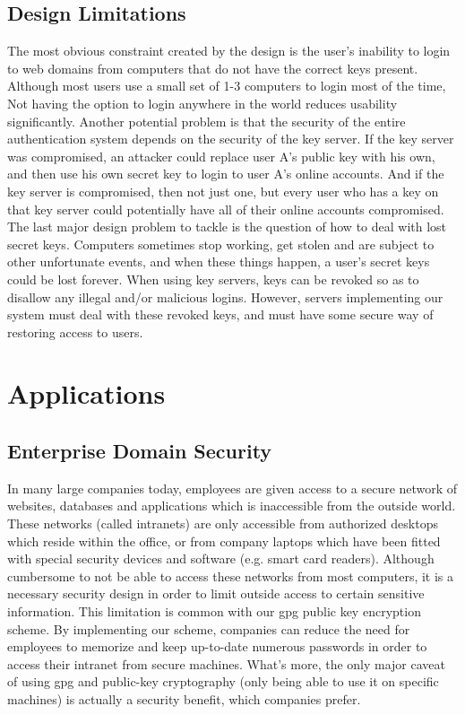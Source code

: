 \documentclass[11pt]{article}
\begin{document}
\subsection{Design Limitations}
The most obvious constraint created by the design is the user's inability to login to web domains from computers that do not have the correct keys present.  Although most users use a small set of 1-3 computers to login most of the time, Not having the option to login anywhere in the world reduces usability significantly.  Another potential problem is that the security of the entire authentication system depends on the security of the key server.  If the key server was compromised, an attacker could replace user A's public key with his own, and then use his own secret key to login to user A's online accounts.  And if the key server is compromised, then not just one, but every user who has a key on that key server could potentially have all of their online accounts compromised.  The last major design problem to tackle is the question of how to deal with lost secret keys.  Computers sometimes stop working, get stolen and are subject to other unfortunate events, and when these things happen, a user's secret keys could be lost forever.  When using key servers, keys can be revoked so as to disallow any illegal and/or malicious logins.  However, servers implementing our system must deal with these revoked keys, and must have some secure way of restoring access to users.

\section{Applications} \label{sec:applications}
\subsection{Enterprise Domain Security} \label{subsec:enterprisedomainsecurity}
In many large companies today, employees are given access to a secure network of websites, databases and applications which is inaccessible from the outside world.  These networks (called intranets) are only accessible from authorized desktops which reside within the office, or from company laptops which have been fitted with special security devices and software (e.g. smart card readers).  Although cumbersome to not be able to access these networks from most computers, it is a necessary security design in order to limit outside access to certain sensitive information.  This limitation is common with our gpg public key encryption scheme.  By implementing our scheme, companies can reduce the need for employees to memorize and keep up-to-date numerous passwords in order to access their intranet from secure machines.  What's more, the only major caveat of using gpg and public-key cryptography (only being able to use it on specific machines) is actually a security benefit, which companies prefer.
\end{document}
